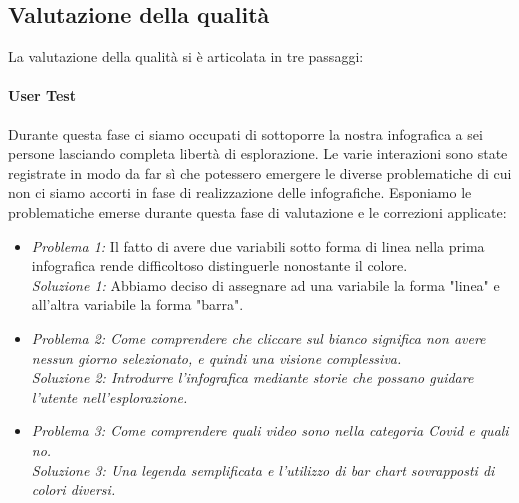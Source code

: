 \documentclass[10pt, a4paper,openany]{article}
\begin{document}
\subsection*{Valutazione della qualità}
La valutazione della qualità si è articolata in tre passaggi:

\paragraph{User Test} Durante questa fase ci siamo occupati di sottoporre la nostra infografica a sei persone lasciando completa libertà di esplorazione. Le varie interazioni sono state registrate in modo da far sì che potessero emergere le diverse problematiche di cui non ci siamo accorti in fase di realizzazione delle infografiche. Esponiamo le problematiche emerse durante questa fase di valutazione e le correzioni applicate:

\begin{itemize}
	\item \textit{Problema 1:} Il fatto di avere due variabili sotto forma di linea nella prima infografica rende difficoltoso distinguerle nonostante il colore.\\\textit{Soluzione 1:} Abbiamo deciso di assegnare ad una variabile la forma "linea" e all'altra variabile la forma "barra".
	\item  \textit{Problema 2: Come comprendere che cliccare sul bianco significa non avere nessun giorno selezionato, e quindi una visione complessiva.}\\\textit{Soluzione 2: Introdurre l'infografica mediante storie che possano guidare l'utente nell'esplorazione.} 
	\item  \textit{Problema 3: Come comprendere quali video sono nella categoria Covid e quali no.} \\\textit{Soluzione 3: Una legenda semplificata e l'utilizzo di bar chart sovrapposti di colori diversi.} 
\end{itemize}
\end{document}
